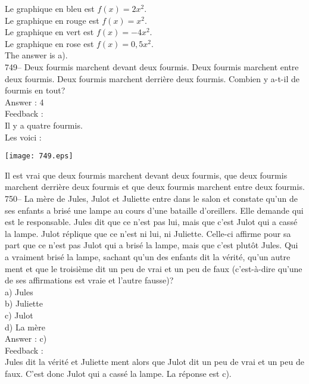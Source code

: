 \documentclass[letterpaper, 12pt]{article}
\begin{document}
Le graphique en bleu est $f(x)=2x^{2}$.\\
Le graphique en rouge est $f(x)=x^{2}$.\\
Le graphique en vert est $f(x)=-4x^{2}$.\\
Le graphique en rose est $f(x)=0,5x^{2}$.\\
The answer is a).\\


749-- Deux fourmis marchent devant deux fourmis.  Deux fourmis marchent
entre deux fourmis.  Deux fourmis marchent derri\`ere deux fourmis.  Combien
y a-t-il de fourmis en tout?\\


Answer : 4\\

Feedback :\\
Il y a quatre fourmis.\\
Les voici :\\
\begin{center}
\texttt{[image: 749.eps]}
\end{center}

Il est vrai que deux fourmis marchent devant deux fourmis, que deux fourmis
marchent derri\`ere deux fourmis et que deux fourmis marchent entre deux
fourmis. \\

750-- La m\`ere de Jules, Julot et Juliette entre dans le salon et constate
qu'un de ses enfants a bris\'e une lampe au cours d'une bataille
d'oreillers.  Elle demande qui est le responsable. Jules dit que ce n'est
pas lui, mais que c'est Julot qui a cass\'e la lampe.  Julot r\'eplique que
ce n'est ni lui, ni Juliette.  Celle-ci affirme pour sa part que ce n'est
pas Julot qui a bris\'e la lampe, mais que c'est plut\^ot Jules.  Qui a
vraiment bris\'e la lampe, sachant qu'un des enfants dit la v\'erit\'e,
qu'un autre ment et que le troisi\`eme dit un peu de vrai et un peu de faux
(c'est-\`a-dire qu'une de ses affirmations est vraie et l'autre fausse)?\\
a) Jules\\
b) Juliette\\
c) Julot\\
d) La m\`ere\\

Answer : c)\\

Feedback : \\
Jules dit la v\'erit\'e et Juliette ment alors que Julot dit un peu de vrai
et un peu de faux.  C'est donc Julot qui a cass\'e la lampe. La r\'eponse
est c).\\
\end{document}
